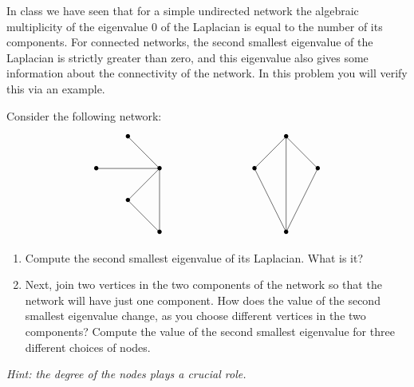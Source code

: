 \documentclass[11pt]{article}
\begin{document}
\newpage
\begin{tcolorbox}[title = 2. Degree and connectivity]
In class we have seen that for a simple undirected network the algebraic multiplicity of the eigenvalue $0$ of the Laplacian is equal to the number of its components. For connected networks, the second smallest eigenvalue of the Laplacian is strictly greater than zero, and this eigenvalue also gives some information about the connectivity of the network. In this problem you will verify this via an example. 

Consider the following network:
\[
\begin{tikzpicture}
\node (1) at (0,0) {$\bullet$};
\node (2) at (2,0) {$\bullet$};
\node (3) at (1,1) {$\bullet$};
\node (4) at (1,-1) {$\bullet$};
\node (5) at (2,-2) {$\bullet$};
\node (6) at (5,0) {$\bullet$};
\node (7) at (7,0) {$\bullet$};
\node (8) at (6,1) {$\bullet$};
\node (9) at (6,-2) {$\bullet$};
\path[-]
(0,0) edge (2,0)
(1,1) edge (2,0)
(1,-1) edge (2,0)
(2,-2) edge (2,0)
(2,-2) edge (1,-1)
(6,-2) edge (6,1)
(6,-2) edge (7,0)
(6,-2) edge (5,0)
(5,0) edge (6,1)
(7,0) edge (6,1)
;
\end{tikzpicture}
\]

\begin{enumerate}
    \item 
    Compute the second smallest eigenvalue of its Laplacian. What is it?

    \item
    Next, join two vertices in the two components of the network so that the network will have just one component. How does the value of the second smallest eigenvalue change, as you choose different vertices in the two components? Compute the value of the second smallest eigenvalue for three different choices of nodes. \\
\end{enumerate}

{\em Hint: the degree of the nodes plays a crucial role.}

\end{tcolorbox}

\end{document}
